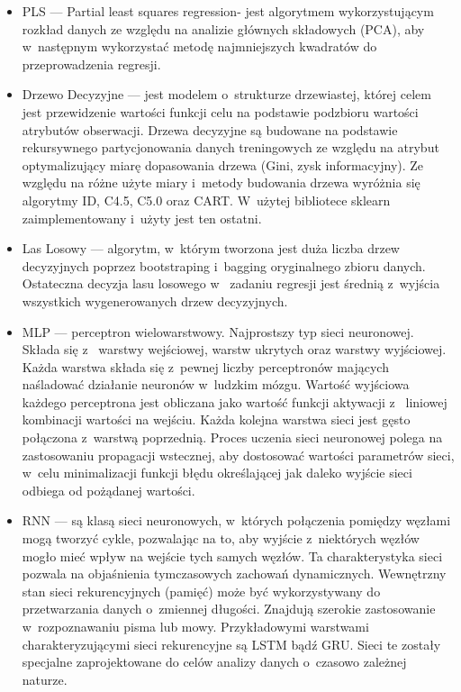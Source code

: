 \begin{itemize}
    \item PLS — Partial least squares regression- jest algorytmem wykorzystującym rozkład
    danych ze względu na analizie głównych składowych (PCA), aby w~następnym wykorzystać metodę
    najmniejszych kwadratów do przeprowadzenia regresji.

    \item Drzewo Decyzyjne — jest modelem o~strukturze drzewiastej, której celem jest
    przewidzenie wartości funkcji celu na podstawie podzbioru wartości atrybutów obserwacji. 
    Drzewa decyzyjne są budowane na podstawie rekursywnego partycjonowania danych treningowych
    ze względu na atrybut optymalizujący miarę dopasowania drzewa (Gini, zysk informacyjny).
    Ze względu na różne użyte miary i~metody budowania drzewa wyróżnia się algorytmy ID, C4.5,
    C5.0 oraz CART. W~użytej bibliotece sklearn zaimplementowany i~użyty jest ten ostatni.

    \item Las Losowy — algorytm, w~którym tworzona jest duża liczba drzew decyzyjnych poprzez
    bootstraping i~bagging oryginalnego zbioru danych. Ostateczna decyzja lasu losowego w~
    zadaniu regresji jest średnią z~wyjścia wszystkich wygenerowanych drzew decyzyjnych.

    \item MLP — perceptron wielowarstwowy. Najprostszy typ sieci neuronowej. Składa się z~
    warstwy wejściowej, warstw ukrytych oraz warstwy wyjściowej. Każda warstwa składa się
    z~pewnej liczby perceptronów mających naśladować działanie neuronów w~ludzkim mózgu.
    Wartość wyjściowa każdego perceptrona jest obliczana jako wartość funkcji aktywacji z~
    liniowej kombinacji wartości na wejściu. Każda kolejna warstwa sieci jest gęsto połączona
    z~warstwą poprzednią.
    Proces uczenia sieci neuronowej polega na zastosowaniu propagacji wstecznej, aby dostosować
    wartości parametrów sieci, w~celu minimalizacji funkcji błędu określającej jak daleko
    wyjście sieci odbiega od pożądanej wartości. 

    \item RNN — są klasą sieci neuronowych, w~których połączenia pomiędzy węzłami
    mogą tworzyć cykle, pozwalając na to, aby wyjście z~niektórych węzłów mogło mieć wpływ na 
    wejście tych samych węzłów. Ta charakterystyka sieci pozwala na objaśnienia tymczasowych 
    zachowań dynamicznych. Wewnętrzny stan sieci rekurencyjnych (pamięć) może być wykorzystywany
    do przetwarzania danych o~zmiennej długości. Znajdują szerokie zastosowanie w~rozpoznawaniu
    pisma lub mowy. Przykładowymi warstwami charakteryzującymi sieci rekurencyjne są LSTM bądź GRU.
    Sieci te zostały specjalne zaprojektowane do celów analizy danych o~czasowo zależnej naturze.


\end{itemize}
